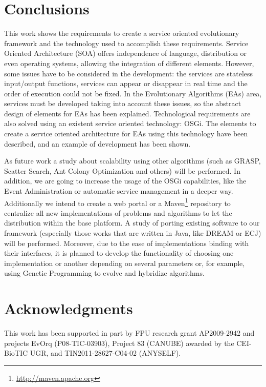\documentclass{sig-alternate}
\begin{document}
\section{Conclusions}
\label{sec:conclusions}
This work shows the requirements to create a service oriented evolutionary framework and the technology used to accomplish these requirements. Service Oriented Architecture (SOA) offers independence of language, distribution or even operating systems, allowing the integration of different elements. However, some issues have to be considered in the development: the services are stateless input/output functions, services can appear or disappear in real time and the order of execution could not be fixed. In the Evolutionary Algorithms (EAs) area, services must be developed taking into account these issues, so the abstract design of elements for EAs has been explained. Technological requirements are also solved using an existent service oriented technology: OSGi. The elements to create a service oriented architecture for EAs using this technology have been described, and an example of development has been shown.

As future work a study about scalability using other algorithms (such as GRASP, Scatter Search, Ant Colony Optimization and others) will be performed. In addition, we are going to increase the usage of the OSGi capabilities, like the Event Administration or automatic service management in a deeper way.
Additionally we intend to create a web portal or a Maven\footnote{\url{http://maven.apache.org}} repository to centralize all new implementations of problems and algorithms to let the distribution within the base platform. A study of porting existing software to our framework (especially those works that are written in Java, like DREAM or ECJ) will be performed. Moreover, due to the ease of implementations binding with their interfaces, it is planned to develop the functionality of choosing one implementation or another depending on several parameters or, for example, using Genetic Programming to evolve and hybridize algorithms.

\section{Acknowledgments}
This work has been supported in part by FPU research grant AP2009-2942 and projects EvOrq (P08-TIC-03903), Project 83 (CANUBE) awarded by the CEI-BioTIC UGR, and TIN2011-28627-C04-02 (ANYSELF).

%



\end{document}
